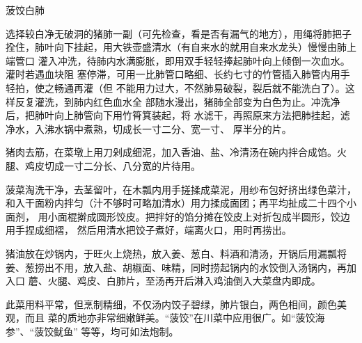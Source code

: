 \begin{recipe}[菠饺银肺]{菠饺白肺}

\ingredients


\preparation

\step 选择较白净无破洞的猪肺一副（可先检查，看是否有漏气的地方），用绳将肺把子
拴住，肺叶向下挂起，用大铁壶盛清水（有自来水的就用自来水龙头）慢慢由肺上端管口
灌入冲洗，待肺内水满膨胀，即用双手轻轻捧起肺叶向上倾倒一次血水。灌时若遇血块阻
塞停滞，可用一比肺管口略细、长约七寸的竹管插入肺管内用手轻拍，使之畅通再灌（但
不能用力过大，不然肺易破裂，裂后就不能洗白了）。这样反复灌洗，到肺内红色血水全
部随水漫出，猪肺全部变为白色为止。冲洗净后，把肺叶向上肺管向下用竹筲箕装起，将
水滤干，再照原来方法把肺挂起，滤净水，入沸水锅中煮熟，切成长一寸二分、宽一寸、
厚半分的片。

\step 猪肉去筋，在菜墩上用刀剁成细泥，加入香油、盐、冷清汤在碗内拌合成馅。火
腿、鸡皮切成一寸二分长、八分宽的片待用。

\step 菠菜淘洗干净，去茎留叶，在木瓢内用手搓揉成菜泥，用纱布包好挤出绿色菜汁，
和入干面粉内拌匀（汁不够时可略加清水）用力揉成面团；再平均扯成二十四个小面剂，
用小面棍擀成圆形饺皮。把拌好的馅分摊在饺皮上对折包成半圆形，饺边用手捏成细褶，
然后用清水把饺子煮好，端离火口，用时再捞出。

\step 猪油放在炒锅内，于旺火上烧热，放入姜、葱白、料酒和清汤，开锅后用漏瓢将
姜、葱捞出不用，放入盐、胡椒面、味精，同时捞起锅内的水饺倒入汤锅内，再加入口
蘑、火腿、鸡皮、白肺片，至汤再开后淋入鸡油倒入大菜盘内即成。

\features

此菜用料平常，但烹制精细，不仅汤内饺子碧绿，肺片银白，两色相间，颜色美观，而且
菜的质地亦非常细嫩鲜美。“菠饺”在川菜中应用很广。如“菠饺海参”、“菠饺鱿鱼”
等等，均可如法炮制。

\end{recipe}

